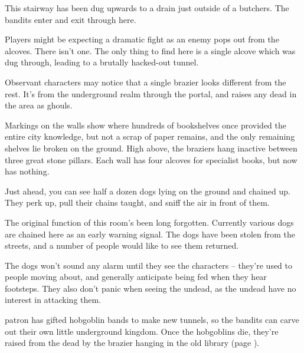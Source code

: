 \begin{multicols}{2}

\label{butcher_exit}

This stairway has been dug upwards to a drain just outside of a butchers.
The bandits enter and exit through here.

\label{oldlibrary}

Players might be expecting a dramatic fight as an enemy pops out from the alcoves.  There isn't one.  The only thing to find here is a single alcove which was dug through, leading to a brutally hacked-out tunnel.

Observant characters may notice that a single brazier looks different from the rest.  It's from the underground realm through the portal, and raises any dead in the area as ghouls.

\begin{boxtext}

	Markings on the walls show where hundreds of bookshelves once provided the entire city knowledge, but not a scrap of paper remains, and the only remaining shelves lie broken on the ground.  High above, the braziers hang inactive between three great stone pillars.  Each wall has four alcoves for specialist books, but now has nothing.

\end{boxtext}


\begin{boxtext}

	Just ahead, you can see half a dozen dogs lying on the ground and chained up.  They perk up, pull their chains taught, and sniff the air in front of them.

\end{boxtext}

The original function of this room's been long forgotten.  Currently various dogs are chained here as an early warning signal.  The dogs have been stolen from the streets, and a number of people would like to see them returned.

The dogs won't sound any alarm until they see the characters -- they're used to people moving about, and generally anticipate being fed when they hear footsteps.  They also don't panic when seeing the undead, as the undead have no interest in attacking them.

\Gls{patron} has gifted hobgoblin bands to make new tunnels, so the bandits can carve out their own little underground kingdom.  Once the hobgoblins die, they're raised from the dead by the brazier hanging in the old library (page \pageref{oldlibrary}).


\end{multicols}
